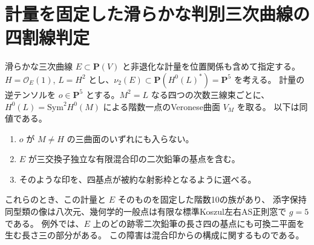 \section{計量を固定した滑らかな判別三次曲線の四割線判定}
\label{sec:marked-fixed-metric-elliptic}
\begin{theorem}\label{thm:marked-fixed-metric-elliptic}
滑らかな三次曲線 $E\subset\mathbf P(V)$ と非退化な計量を位置関係も含めて指定する。
$H=\mathcal O_E(1)$, $L=H^2$ とし、$\nu_2(E)\subset\mathbf P(H^0(L)^*)=\mathbf P^5$ を考える。
計量の逆テンソルを $o\in\mathbf P^5$ とする。$M^2=L$ なる四つの次数三線束ごとに、
$H^0(L)=\mathrm{Sym}^2 H^0(M)$ による階数一点のVeronese曲面 $V_M$ を取る。
以下は同値である。
\begin{enumerate}
\item $o$ が $M\ne H$ の三曲面のいずれにも入らない。
\item $E$ が三交換子独立な有限混合印の二次鉛筆の基点を含む。
\item そのような印を、四基点が被約な射影枠となるように選べる。
\end{enumerate}
これらのとき、この計量と $E$ そのものを固定した階数10の族があり、
添字保持同型類の像は八次元、幾何学的一般点は有限な標準Koszul左右AS正則窓で $g=5$ である。
例外では、$E$ 上のどの跡零二次鉛筆の長さ四の基点にも可換二平面を生む長さ三の部分がある。
この障害は混合印からの構成に関するものである。
\end{theorem}
